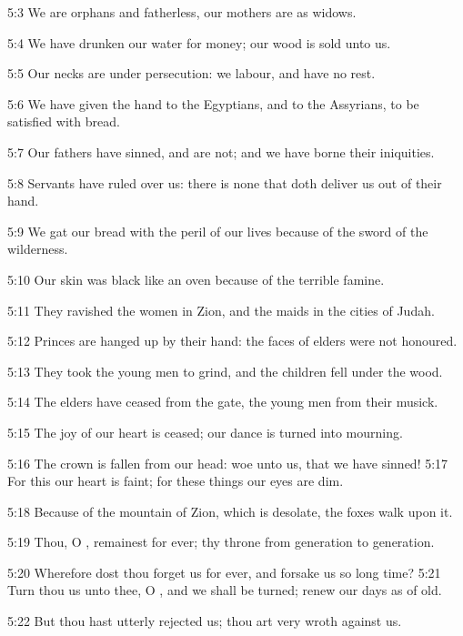5:3 We are orphans and fatherless, our mothers are as widows.

5:4 We have drunken our water for money; our wood is sold unto us.

5:5 Our necks are under persecution: we labour, and have no rest.

5:6 We have given the hand to the Egyptians, and to the Assyrians, to
be satisfied with bread.

5:7 Our fathers have sinned, and are not; and we have borne their
iniquities.

5:8 Servants have ruled over us: there is none that doth deliver us
out of their hand.

5:9 We gat our bread with the peril of our lives because of the sword
of the wilderness.

5:10 Our skin was black like an oven because of the terrible famine.

5:11 They ravished the women in Zion, and the maids in the cities of
Judah.

5:12 Princes are hanged up by their hand: the faces of elders were not
honoured.

5:13 They took the young men to grind, and the children fell under the
wood.

5:14 The elders have ceased from the gate, the young men from their
musick.

5:15 The joy of our heart is ceased; our dance is turned into
mourning.

5:16 The crown is fallen from our head: woe unto us, that we have
sinned!  5:17 For this our heart is faint; for these things our eyes
are dim.

5:18 Because of the mountain of Zion, which is desolate, the foxes
walk upon it.

5:19 Thou, O \LORD, remainest for ever; thy throne from generation to
generation.

5:20 Wherefore dost thou forget us for ever, and forsake us so long
time?  5:21 Turn thou us unto thee, O \LORD, and we shall be turned;
renew our days as of old.

5:22 But thou hast utterly rejected us; thou art very wroth against us.

